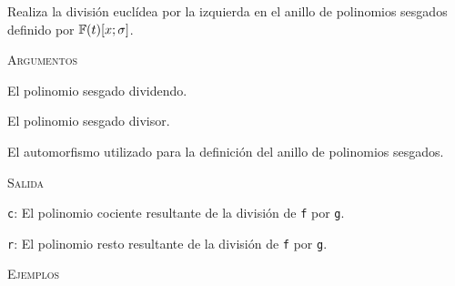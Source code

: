 \begin{description}[leftmargin=1em, font=\ttfamily, style=nextline]

    \item[LeftED(f, g, aut)]
    
    Realiza la división euclídea por la izquierda en el anillo de polinomios sesgados definido por $\mathbb{F}(t)[x;\sigma]$.

    \textsc{Argumentos}

    \begin{description}[font=\normalfont\ttfamily]
        \item[f] El polinomio sesgado dividendo.
        \item[g] El polinomio sesgado divisor.
        \item[aut] El automorfismo utilizado para la definición del anillo de polinomios sesgados.
    \end{description}

    \textsc{Salida}

    \begin{description}[font=\normalfont\ttfamily]
        \item[] \texttt{c}: El polinomio cociente resultante de la división de \texttt{f} por \texttt{g}.
        \item[] \texttt{r}: El polinomio resto resultante de la división de \texttt{f} por \texttt{g}.
    \end{description}

    \textsc{Ejemplos}


\end{description}
